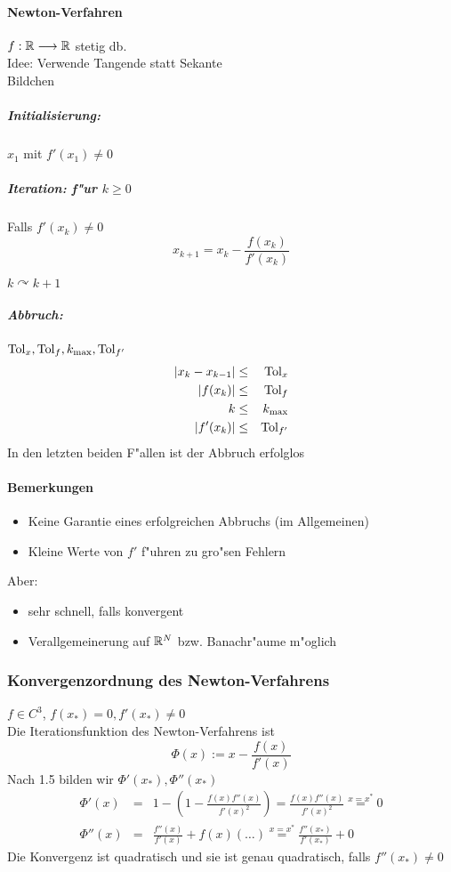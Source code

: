 \documentclass{scrartcl}
\begin{document}
\paragraph*{Newton-Verfahren}
$f: \mathbb{R} \longrightarrow \mathbb{R}$ stetig db. \\
Idee: Verwende Tangende statt Sekante \\
Bildchen \\
\subparagraph*{Initialisierung:} $x_1$ mit $f'(x_1) \neq 0$
\subparagraph*{Iteration: f"ur $k \geq 0$}
\begin{1aufz}
\item Falls $f'(x_k) \neq 0$
$$ x_{k+1} = x_k - \frac{f(x_k)}{f'(x_k)}$$
\item $k \curvearrowright k+1$
\end{1aufz}
\subparagraph*{Abbruch:}
$\mathrm{Tol}_x, \mathrm{Tol}_f, k_\mathrm{max}, \mathrm{Tol}_{f'}$
\begin{eqnarray*}
\vert x_k - x_{k-1} \vert & \leq & \mathrm{Tol}_x \\
\vert f(x_k) \vert & \leq & \mathrm{Tol}_f \\
k & \leq & k_\mathrm{max} \\
\vert f'(x_k) \vert & \leq & \mathrm{Tol}_{f'} 
\end{eqnarray*}
In den letzten beiden F"allen ist der Abbruch erfolglos

\paragraph*{Bemerkungen}
\begin{itemize}
\item Keine Garantie eines erfolgreichen Abbruchs (im Allgemeinen)
\item Kleine Werte von $f'$ f"uhren zu gro"sen Fehlern
\end{itemize}
Aber:
\begin{itemize}
\item sehr schnell, falls konvergent 
\item Verallgemeinerung auf $\mathbb{R}^N$ bzw. Banachr"aume m"oglich
\end{itemize}

\subsubsection*{Konvergenzordnung des Newton-Verfahrens}
$f \in C^3$, $f(x_*)=0, f'(x_*) \neq 0$ \\
Die Iterationsfunktion des Newton-Verfahrens ist
$$\Phi(x) := x - \frac{f(x)}{f'(x)}$$
Nach 1.5 bilden wir $\Phi'(x_*), \Phi''(x_*)$
\begin{eqnarray*}
\Phi'(x) & = & 1 - \left( 1 - \frac{ f(x) f''(x) }{f'(x)^2} \right) = \frac{f(x)f''(x)}{f'(x)^2} \stackrel{x=x^*}{=} 0 \\
\Phi''(x) & = & \frac{f''(x)}{f'(x)} + f(x) ( \ldots ) \stackrel{x=x^*}{=} \frac{f''(x_*)}{f'(x_*)} + 0
\end{eqnarray*}
Die Konvergenz ist quadratisch und sie ist genau quadratisch, falls $f''(x_*) \neq 0$
\end{document}
